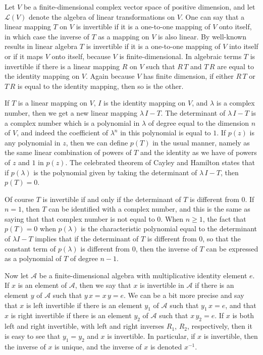 \documentclass[12pt,leqno,draft]{article}
\begin{document}

	Let $V$ be a finite-dimensional complex vector space of
positive dimension, and let $\mathcal{L}(V)$ denote the algebra of
linear transformations on $V$.  One can say that a linear mapping $T$
on $V$ is invertible if it is a one-to-one mapping of $V$ onto itself,
in which case the inverse of $T$ as a mapping on $V$ is also linear.
By well-known results in linear algebra $T$ is invertible if it is a
one-to-one mapping of $V$ into itself or if it maps $V$ onto itself,
because $V$ is finite-dimensional.  In algebraic terms $T$ is
invertible if there is a linear mapping $R$ on $V$ such that $R \, T$
and $T \, R$ are equal to the identity mapping on $V$.  Again because
$V$ has finite dimension, if either $R \, T$ or $T \, R$ is equal to
the identity mapping, then so is the other.

	If $T$ is a linear mapping on $V$, $I$ is the identity mapping
on $V$, and $\lambda$ is a complex number, then we get a new linear
mapping $\lambda \, I - T$.  The determinant of $\lambda \, I - T$ is
a complex number which is a polynomial in $\lambda$ of degree equal to
the dimension $n$ of $V$, and indeed the coefficient of $\lambda^n$ in
this polynomial is equal to $1$.  If $p(z)$ is any polynomial in $z$,
then we can define $p(T)$ in the usual manner, namely as the same
linear combination of powers of $T$ and the identity as we have of
powers of $z$ and $1$ in $p(z)$.  The celebrated theorem of Cayley and
Hamilton states that if $p(\lambda)$ is the polynomial given by taking
the determinant of $\lambda \, I - T$, then $p(T) = 0$.

	Of course $T$ is invertible if and only if the determinant of
$T$ is different from $0$.  If $n = 1$, then $T$ can be identified
with a complex number, and this is the same as saying that that
complex number is not equal to $0$.  When $n \ge 1$, the fact that
$p(T) = 0$ when $p(\lambda)$ is the characteristic polynomial equal to
the determinant of $\lambda I - T$ implies that if the determinant of
$T$ is different from $0$, so that the constant term of $p(\lambda)$
is different from $0$, then the inverse of $T$ can be expressed as a
polynomial of $T$ of degree $n - 1$.

	Now let $\mathcal{A}$ be a finite-dimensional algebra with
multiplicative identity element $e$.  If $x$ is an element of
$\mathcal{A}$, then we say that $x$ is invertible in $\mathcal{A}$ if
there is an element $y$ of $\mathcal{A}$ such that $y \, x = x \, y =
e$.  We can be a bit more precise and say that $x$ is left invertible
if there is an element $y_1$ of $\mathcal{A}$ such that $y_1 \, x =
e$, and that $x$ is right invertible if there is an element $y_2$ of
$\mathcal{A}$ such that $x \, y_2 = e$.  If $x$ is both left and right
invertible, with left and right inverses $R_1$, $R_2$, respectively,
then it is easy to see that $y_1 = y_2$ and $x$ is invertible.  In
particular, if $x$ is invertible, then the inverse of $x$ is unique,
and the inverse of $x$ is denoted $x^{-1}$.
\end{document}
